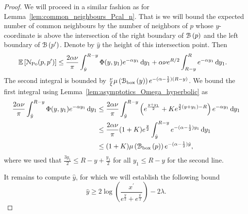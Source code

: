 \begin{proof}
We will proceed in a similar fashion as for Lemma~\ref{lem:common_neighbours_Pcal_n}. That is we will bound the expected number of common neighbours by the number of neighbors of $p$ whose $y$-coordinate is above the intersection of the right boundary of ${\mathcal B}\left(p\right)$ and the left boundary of ${\mathcal B}\left(p^\prime\right)$. Denote by $\hat{y}$ the height of this intersection point. Then
\begin{align*}
	\mathbb{E}\left[{\mathcal N}_{{\mathrm{Po}}}(p,p^\prime)\right] &\le \frac{2\alpha \nu}{\pi} \int_{\hat{y}}^{R-y} \Phi(y,y_1) e^{-\alpha y_1} \operatorname{\mathrm{d}\hspace{-2pt}} y_1
		+ \alpha \nu e^{R/2} \int_{R-y}^{R} e^{-\alpha y_1} \operatorname{\mathrm{d}\hspace{-2pt}} y_1.
\end{align*} 
The second integral is bounded by $\frac{\nu}{\xi} \mu\left({\mathcal B}_{\text{box}}\left(y\right)\right) e^{-(\alpha - \frac{1}{2})(R-y)}$. We bound the first integral using Lemma~\ref{lem:asymptotics_Omega_hyperbolic} as
\begin{align*}
	\frac{2\alpha \nu}{\pi} \int_{\hat{y}}^{R-y} \Phi(y,y_1) e^{-\alpha y_1} \operatorname{\mathrm{d}\hspace{-2pt}} y_1
	&\le \frac{2\alpha \nu}{\pi} \int_{\hat{y}}^{R-y} \left(e^{\frac{y+y_1}{2}} + K e^{\frac{3}{2}(y + y_1)-R}\right) 
		e^{-\alpha y_1} \operatorname{\mathrm{d}\hspace{-2pt}} y_1 \\
	&\le \frac{2\alpha \nu}{\pi} (1+K)e^{\frac{y}{2}} \int_{\hat{y}}^{R-y} e^{-(\alpha - \frac{1}{2}) y_1} \operatorname{\mathrm{d}\hspace{-2pt}} y_1\\
	&\le (1 + K)\mu\left({\mathcal B}_{\text{box}}\left(p\right)\right)  e^{-(\alpha - \frac{1}{2})\hat{y}},
\end{align*}
where we used that $\frac{3y_1}{2} \le R - y + \frac{y_1}{2}$ for all $y_1 \le R-y$ for the second line. 

It remains to compute $\hat{y}$, for which we will establish the following bound
\begin{equation}\label{eq:joint_neighbors_KPKVB_intersection}
	\hat{y} \ge 2 \log\left(\frac{x^\prime}{e^{\frac{y}{2}} + e^{\frac{y^\prime}{2}}}\right) - 2\lambda.
\end{equation}


\end{proof}
